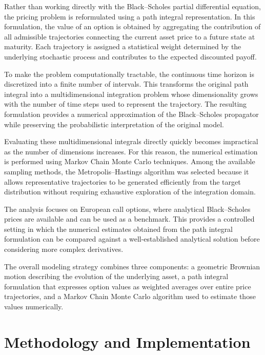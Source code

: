 \documentclass[
  12pt,
  letterpaper,
]{book}
\begin{document}
Rather than working directly with the Black--Scholes partial
differential equation, the pricing problem is reformulated using a path
integral representation. In this formulation, the value of an option is
obtained by aggregating the contribution of all admissible trajectories
connecting the current asset price to a future state at maturity. Each
trajectory is assigned a statistical weight determined by the underlying
stochastic process and contributes to the expected discounted payoff.

To make the problem computationally tractable, the continuous time
horizon is discretized into a finite number of intervals. This
transforms the original path integral into a multidimensional
integration problem whose dimensionality grows with the number of time
steps used to represent the trajectory. The resulting formulation
provides a numerical approximation of the Black--Scholes propagator
while preserving the probabilistic interpretation of the original model.

Evaluating these multidimensional integrals directly quickly becomes
impractical as the number of dimensions increases. For this reason, the
numerical estimation is performed using Markov Chain Monte Carlo
techniques. Among the available sampling methods, the
Metropolis--Hastings algorithm was selected because it allows
representative trajectories to be generated efficiently from the target
distribution without requiring exhaustive exploration of the integration
domain.

The analysis focuses on European call options, where analytical
Black--Scholes prices are available and can be used as a benchmark. This
provides a controlled setting in which the numerical estimates obtained
from the path integral formulation can be compared against a
well-established analytical solution before considering more complex
derivatives.

The overall modeling strategy combines three components: a geometric
Brownian motion describing the evolution of the underlying asset, a path
integral formulation that expresses option values as weighted averages
over entire price trajectories, and a Markov Chain Monte Carlo algorithm
used to estimate those values numerically.

\section{Methodology and
Implementation}\label{methodology-and-implementation-2}
\end{document}
